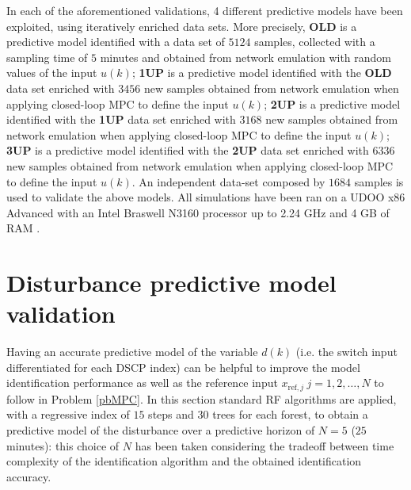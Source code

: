 In each of the aforementioned validations, 4 different predictive models have been exploited, using iteratively enriched data sets. More precisely, \textbf{OLD} is a predictive model identified with a data set of $5124$ samples, collected with a sampling time of $5$ minutes and obtained from network emulation with random values of the input $u(k)$; \textbf{1UP} is a predictive model identified with the \textbf{OLD} data set enriched with $3456$ new samples obtained from network emulation when applying closed-loop MPC to define the input $u(k)$; \textbf{2UP} is a predictive model identified with the \textbf{1UP} data set enriched with $3168$ new samples obtained from network emulation when applying closed-loop MPC to define the input $u(k)$; \textbf{3UP} is a predictive model identified with the \textbf{2UP} data set enriched with $6336$ new samples obtained from network emulation when applying closed-loop MPC to define the input $u(k)$. An independent data-set composed by $1684$ samples is used to validate the above models.
All simulations have been ran on a UDOO x86 Advanced with an Intel Braswell N3160 processor up to 2.24 GHz and 4 GB of RAM \cite{UDOO}.


\section {Disturbance predictive model validation} Having an accurate predictive model of the variable $d(k)$ (i.e. the switch input differentiated for each DSCP index) can be helpful to improve the model identification performance as well as the reference input $x_{\mathrm{ref},j} \hspace{3pt} j=1,2, \hdots, N$ to follow in Problem \ref{pbMPC}. In this section  standard RF algorithms are applied, with a regressive index of $15$ steps and $30$ trees for each forest, to obtain a predictive model of the disturbance over a predictive horizon of $N=5$ ($25$ minutes): this choice of $N$ has been taken considering the tradeoff between time complexity of the identification algorithm and the obtained identification accuracy. 

